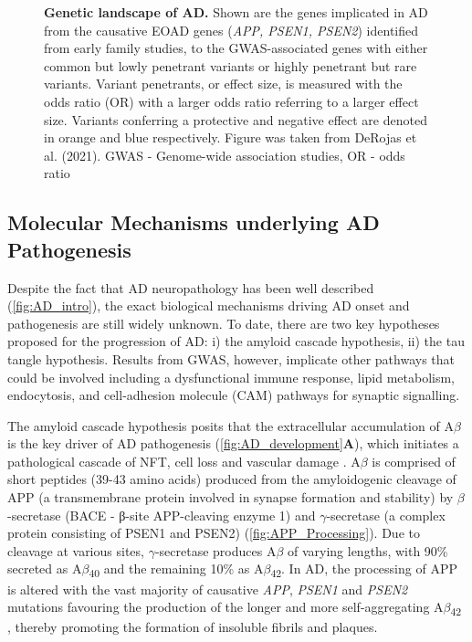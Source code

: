 \begin{landscape}
\begin{figure}[!htp]
		\caption[Genetic landscape of AD]%
		{\textbf{Genetic landscape of AD.} Shown are the genes implicated in AD from the causative EOAD genes (\textit{APP, PSEN1, PSEN2}) identified from early family studies, to the GWAS-associated genes with either common but lowly penetrant variants or highly penetrant but rare variants. Variant penetrants, or effect size, is measured with the odds ratio (OR) with a larger odds ratio referring to a larger effect size. Variants conferring a protective and negative effect are denoted in orange and blue respectively. Figure was taken from DeRojas et al. (2021)\cite{DeRojas2021}. GWAS - Genome-wide association studies, OR - odds ratio
		}
		\label{fig:AD_gwas}
	\end{figure}
\end{landscape}

\subsection{Molecular Mechanisms underlying AD Pathogenesis}
\label{aetiologyAD}
Despite the fact that AD neuropathology has been well described (\cref{fig:AD_intro}), the exact biological mechanisms driving AD onset and pathogenesis are still widely unknown. To date, there are two key hypotheses proposed for the progression of AD: i) the amyloid cascade hypothesis, ii) the tau tangle hypothesis. Results from GWAS, however, implicate other pathways that could be involved including a dysfunctional immune response, lipid metabolism, endocytosis, and cell-adhesion molecule (CAM) pathways for synaptic signalling.  

The amyloid cascade hypothesis posits that the extracellular accumulation of A$\beta$ is the key driver of AD pathogenesis (\cref{fig:AD_development}\textbf{A}), which initiates a pathological cascade of NFT, cell loss and vascular damage \cite{Hardy1992}. A$\beta$ is comprised of short peptides (39-43 amino acids) \cite{J1987} produced from the amyloidogenic cleavage of APP (a transmembrane protein involved in synapse formation and stability) by $\beta$-secretase (BACE - β-site APP-cleaving enzyme 1) and $\gamma$-secretase (a complex protein consisting of PSEN1 and PSEN2) (\cref{fig:APP_Processing}). Due to cleavage at various sites, $\gamma$-secretase produces A$\beta$ of varying lengths, with 90\% secreted as A$\beta$\textsubscript{40} and the remaining 10\% as A$\beta$\textsubscript{42}\cite{Asami-Odaka1995}. In AD, the processing of APP is altered with the vast majority of causative \textit{APP}, \textit{PSEN1} and \textit{PSEN2} mutations favouring the production of the longer and more self-aggregating A$\beta$\textsubscript{42} \cite{Li2019,D1996,JT1993}, thereby promoting the formation of insoluble fibrils and plaques\cite{JT1993}. 

